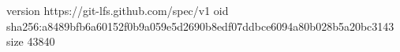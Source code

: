 version https://git-lfs.github.com/spec/v1
oid sha256:a8489bfb6a60152f0b9a059e5d2690b8edf07ddbce6094a80b028b5a20bc3143
size 43840
